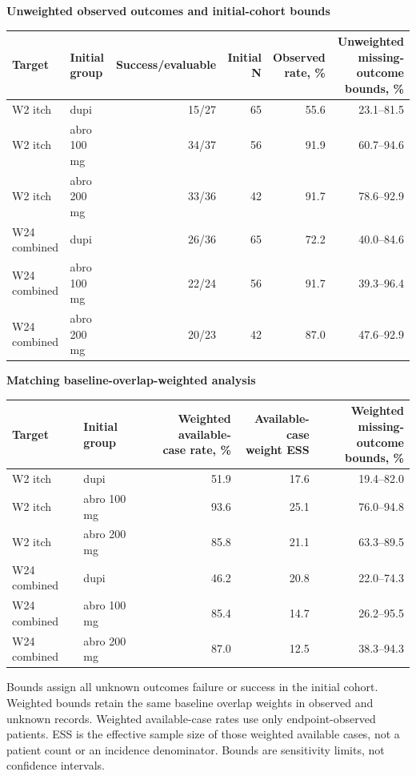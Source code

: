 \begin{center}\small\textbf{Unweighted observed outcomes and initial-cohort bounds}\par\smallskip\begin{tabular}{llrrrr}\toprule Target & Initial group & Success/evaluable & Initial N & \shortstack{Observed\\rate, \%} & \shortstack{Unweighted missing-\\outcome bounds, \%} \\ \midrule
W2 itch & dupi & 15/27 & 65 & 55.6 & 23.1--81.5 \\
W2 itch & abro 100 mg & 34/37 & 56 & 91.9 & 60.7--94.6 \\
W2 itch & abro 200 mg & 33/36 & 42 & 91.7 & 78.6--92.9 \\
W24 combined & dupi & 26/36 & 65 & 72.2 & 40.0--84.6 \\
W24 combined & abro 100 mg & 22/24 & 56 & 91.7 & 39.3--96.4 \\
W24 combined & abro 200 mg & 20/23 & 42 & 87.0 & 47.6--92.9 \\
\bottomrule\end{tabular}\par\medskip\textbf{Matching baseline-overlap-weighted analysis}\par\smallskip\begin{tabular}{llrrr}\toprule Target & Initial group & \shortstack{Weighted available-\\case rate, \%} & \shortstack{Available-case\\weight ESS} & \shortstack{Weighted missing-\\outcome bounds, \%} \\ \midrule
W2 itch & dupi & 51.9 & 17.6 & 19.4--82.0 \\
W2 itch & abro 100 mg & 93.6 & 25.1 & 76.0--94.8 \\
W2 itch & abro 200 mg & 85.8 & 21.1 & 63.3--89.5 \\
W24 combined & dupi & 46.2 & 20.8 & 22.0--74.3 \\
W24 combined & abro 100 mg & 85.4 & 14.7 & 26.2--95.5 \\
W24 combined & abro 200 mg & 87.0 & 12.5 & 38.3--94.3 \\
\bottomrule\end{tabular}
\par\smallskip\parbox{.97\linewidth}{\footnotesize Bounds assign all unknown outcomes failure or success in the initial cohort. Weighted bounds retain the same baseline overlap weights in observed and unknown records. Weighted available-case rates use only endpoint-observed patients. ESS is the effective sample size of those weighted available cases, not a patient count or an incidence denominator. Bounds are sensitivity limits, not confidence intervals.}
\end{center}
